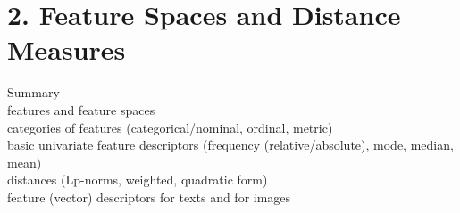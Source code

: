 \documentclass[a4paper,10pt,titlepage]{report}
\begin{document}
\newpage
\section{2. Feature Spaces and Distance Measures}
	Summary\\
\hspace{10mm}		features and feature spaces\\
\hspace{10mm}		categories of features (categorical/nominal, ordinal, metric)\\
\hspace{10mm}		basic univariate feature descriptors (frequency (relative/absolute), mode, median, mean)\\
\hspace{10mm}		distances (Lp-norms, weighted, quadratic form)\\
\hspace{10mm}		feature (vector) descriptors for texts and for images\\
\end{document}
